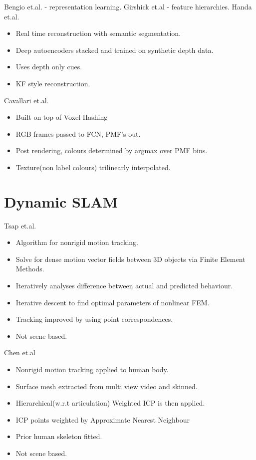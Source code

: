 Bengio et.al. \cite{Bengio2013} - representation learning.
Girshick et.al \cite{Girshick2014} - feature hierarchies.
Handa et.al. \cite{Handa2015}
\begin{itemize}
	\item Real time reconstruction with semantic segmentation.
	\item Deep autoencoders stacked and trained on synthetic depth data.
	\item Uses depth only cues.
	\item KF style reconstruction.
\end{itemize}

Cavallari et.al. \cite{Cavallari2016}
\begin{itemize}
	\item Built on top of Voxel Hashing
	\item RGB frames passed to FCN\cite{Shelhamer2017}, PMF's out.
	\item Post rendering, colours determined by argmax over PMF bins.
	\item Texture(non label colours) trilinearly interpolated.
\end{itemize}

\section{Dynamic SLAM}
\label{sec:lit_review_dynamic}
Tsap et.al. \cite{Tsap2000}
\begin{itemize}
	\item Algorithm for nonrigid motion tracking.
	\item Solve for dense motion vector fields between 3D objects via Finite Element Methods. %
	\item Iteratively analyses difference between actual and predicted behaviour.
	\item Iterative descent to find optimal parameters of nonlinear FEM.
	\item Tracking improved by using point correspondences.
	\item Not scene based.
\end{itemize}

Chen et.al \cite{Chen2011}
\begin{itemize}
	\item Nonrigid motion tracking applied to human body.
	\item Surface mesh extracted from multi view video and skinned.
	\item Hierarchical(w.r.t articulation) Weighted ICP is then applied.
	\item ICP points weighted by Approximate Nearest Neighbour %
	\item Prior human skeleton fitted.
	\item Not scene based.
\end{itemize}

